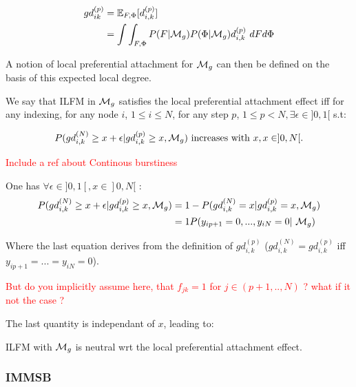 \begin{align*}
gd_{ik}^{(p)} &= \mathbb{E}_{F,\Phi}[d_{i,k}^{(p)}] \\
    &= \int\int_{F, \Phi} P(F|\mathcal{M}_g)P(\Phi|\mathcal{M}_g) d_{i,k}^{(p)}\ dF d\Phi
\end{align*}

A notion of local preferential attachment for $\mathcal{M}_g$ can then be defined on the basis of this expected local degree.

\begin{definition}
We say that ILFM in $\mathcal{M}_g$ satisfies the local preferential attachment effect iff for any indexing, for any node $i$, $1 \leq i \leq N$, for any step $p$, $1 \leq p < N, \exists \epsilon \in ]0,1[$ s.t:

\begin{equation*}
P(gd_{i,k}^{(N)} \geq x + \epsilon | gd_{i,k}^{(p)} \geq x, \mathcal{M}_g) \textrm{ increases with } x, x \in ]0,N[.
\end{equation*}

\end{definition}

\textcolor{red}{Include a ref about Continous burstiness}

One has $\forall \epsilon \in ]0,1[, x \in ]0,N[$ :
\begin{align*}
P(gd_{i,k}^{(N)} \geq x + \epsilon | gd_{i,k}^{(p)} \geq x, \M_g) &= 1 - P(gd_{i,k}^{(N)} =x | gd_{i,k}^{(p)} = x, \M_g) \\
    &= 1 P(y_{ip+1}=0, ..., y_{iN}=0  | \M_g)
\end{align*}

Where the last equation derives from the definition of $gd_{i,k}^{(p)}$ ($gd_{i,k}^{(N)} = gd_{i,k}^{(p)}$ iff $y_{ip+1}=...=y_{iN}=0$).

\textcolor{red}{But do you implicitly assume here, that $f_{jk}=1$ for $j \in (p+1,.., N)$ ? what if it not the case ?}

The last quantity is independant of $x$, leading to:

\begin{proposition}
ILFM with $\mathcal{M}_g$ is neutral wrt the local preferential attachment effect.

\end{proposition}

\subsubsection{IMMSB}

